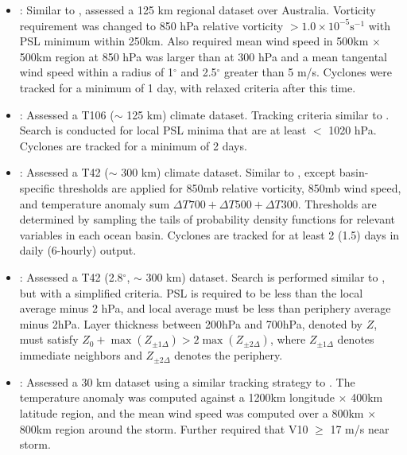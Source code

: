\documentclass[gmdd, hvmath, online]{copernicus_discussions}
\begin{document}
\begin{itemize}
\item \cite{nguyen2001interannual}:  Similar to \cite{walsh1997tropical}, assessed a 125 km regional dataset over Australia.  Vorticity requirement was changed to 850 hPa relative vorticity $> 1.0 \times 10^{-5} \mbox{s}^{-1}$ with PSL minimum within 250km.  Also required mean wind speed in 500km $\times$ 500km region at 850 hPa was larger than at 300 hPa and a mean tangental wind speed within a radius of 1$^\circ$ and 2.5$^\circ$ greater than 5 m/s.  Cyclones were tracked for a minimum of 1 day, with relaxed criteria after this time.

\item \cite{sugi2002influence}:  Assessed a T106 ($\sim$ 125 km) climate dataset.  Tracking criteria similar to \cite{bengtsson1995hurricane}.  Search is conducted for local PSL minima that are at least $<$ 1020 hPa.  Cyclones are tracked for a minimum of 2 days.

\item \cite{camargo2002improving}:  Assessed a T42 ($\sim$ 300 km) climate dataset.  Similar to \cite{bengtsson1995hurricane, bengtsson1996will}, except basin-specific thresholds are applied for 850mb relative vorticity, 850mb wind speed, and temperature anomaly sum $\Delta T700+ \Delta T500+ \Delta T300$. Thresholds are determined by sampling the tails of probability density functions for relevant variables in each ocean basin. Cyclones are tracked for at least 2 (1.5) days in daily (6-hourly) output.

\item \cite{tsutsui2002implications}:  Assessed a T42 (2.8$^\circ$, $\sim$ 300 km) dataset.  Search is performed similar to \cite{tsutsui1996simulated}, but with a simplified criteria.  PSL is required to be less than the local average minus 2 hPa, and local average must be less than periphery average minus 2hPa.  Layer thickness between 200hPa and 700hPa, denoted by $Z$, must satisfy $Z_0 + \max(Z_{\pm 1 \Delta}) > 2 \max(Z_{\pm 2 \Delta})$, where $Z_{\pm 1 \Delta}$ denotes immediate neighbors and $Z_{\pm 2 \Delta}$ denotes the periphery.

\item \cite{walsh2004fine}:  Assessed a 30 km dataset using a similar tracking strategy to \cite{nguyen2001interannual}.  The temperature anomaly was computed against a 1200km longitude $\times$ 400km latitude region, and the mean wind speed was computed over a 800km $\times$ 800km region around the storm.  Further required that V10 $\geq$ 17 m/s near storm.


\end{itemize}
\end{document}
